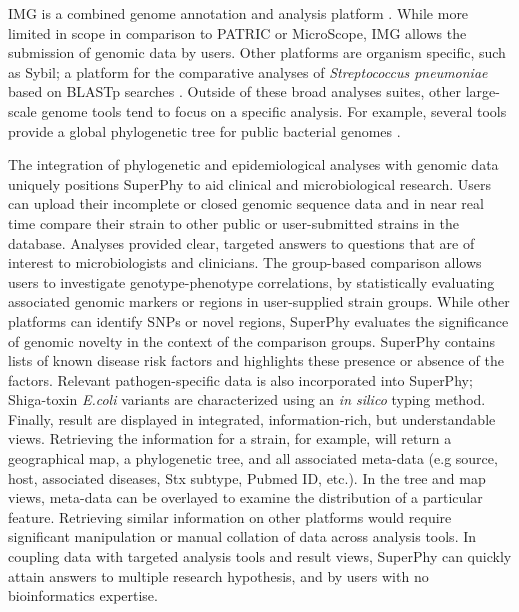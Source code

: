 \documentclass[a4paper,twoside]{article}
\begin{document}
IMG is a combined genome annotation and analysis platform \cite{marko2013}. While more limited in scope in comparison to PATRIC or MicroScope, IMG allows the submission of genomic data by users. Other platforms are organism specific, such as Sybil; a platform for the comparative analyses of \textit{Streptococcus pneumoniae} based on BLASTp searches \cite{riley_using_2012}. Outside of these broad analyses suites, other large-scale genome tools tend to focus on a specific analysis. For example, several tools provide a global phylogenetic tree for public bacterial genomes \cite{letunic2011,fang2013,federhen2012}.

The integration of phylogenetic and epidemiological analyses with genomic data uniquely positions SuperPhy to aid clinical and microbiological research. Users can upload their incomplete or closed genomic sequence data and in near real time compare their strain to other public or user-submitted strains in the database. Analyses provided clear, targeted answers to questions that are of interest to microbiologists and clinicians.  The group-based comparison allows users to investigate genotype-phenotype correlations, by statistically evaluating associated genomic markers or regions in user-supplied strain groups. While other platforms can identify SNPs or novel regions, SuperPhy evaluates the significance of genomic novelty in the context of the comparison groups. SuperPhy contains lists of known disease risk factors and highlights these presence or absence of the factors. Relevant pathogen-specific data is also incorporated into SuperPhy; Shiga-toxin \textit{E.coli} variants are characterized using an \textit{in silico} typing method. Finally, result are displayed in integrated, information-rich, but understandable views. Retrieving the information for a strain, for example, will return a geographical map, a phylogenetic tree, and all associated meta-data (e.g source, host, associated diseases, Stx subtype, Pubmed ID, etc.). In the tree and map views, meta-data can be overlayed to examine the distribution of a particular feature.  Retrieving similar information on other platforms would require significant manipulation or manual collation of data across analysis tools. In coupling data with targeted analysis tools and result views, SuperPhy can quickly attain answers to multiple research hypothesis, and by users with no bioinformatics expertise.
\end{document}
